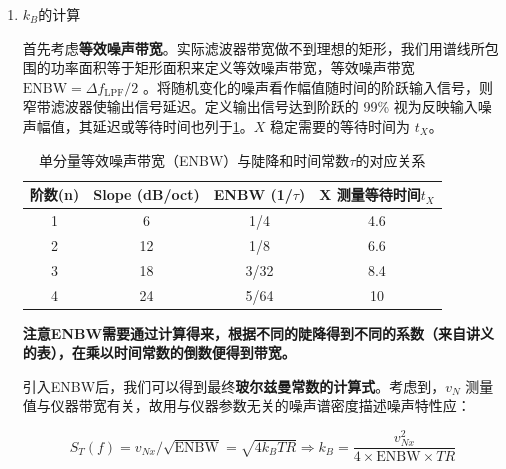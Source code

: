 \begin{enumerate}
	此外，锁相放大器自身产生的本底噪声也需要从测量结果中扣除，假设本底噪声的功率为 \( n_{\text{Bx}}^2 \)，最终修正后的噪声功率为：
	\[
	n_{\text{Tx}}^2 = n_{\text{Rx}}^2 \left[ 1 + (\omega R_{\text{in}} C_{\text{in}})^2 \right] - n_{\text{Bx}}^2
	\]
	
	为什么本底噪声不必做输入带宽修正？本底噪声是锁相放大器内部的固有噪声，不经过外部输入电路，因此不会受到输入带宽的影响，也无需进行带宽修正。而外部噪声，如电阻的热噪声，会受到输入阻抗和滤波器的影响，因此需要进行带宽修正。
	
	此外，注意讲义上提到的非随机的环境噪声$n_{ex}$。
	
	实验讲义上提供了具体的数值：影响输入带宽的 $R_{\text{in}}$ 约为 $2/3R$，$C_{\text{in}}$ 约为电缆电容（室温下约为 96pF/m）、锁相放大器输入电容（25pF），与包括连接器和样品盒在内的电容并联后的值的 1/2（约 \textbf{68pF}）。
	
	\item $k_B$的计算
	
	首先考虑\textbf{等效噪声带宽}。实际滤波器带宽做不到理想的矩形，我们用谱线所包围的功率面积等于矩形面积来定义等效噪声带宽，等效噪声带宽 $\text{ENBW} = \Delta f_{\text{LPF}}/2$ 。将随机变化的噪声看作幅值随时间的阶跃输入信号，则窄带滤波器使输出信号延迟。定义输出信号达到阶跃的 99\% 视为反映输入噪声幅值，其延迟或等待时间也列于\cref{tab:ENBW}。$X$ 稳定需要的等待时间为 $t_X$。
	
	\begin{table}[h!]
		\centering
		\caption{单分量等效噪声带宽（ENBW）与陡降和时间常数$\tau$的对应关系}
		\label{tab:ENBW}
		\begin{tabular}{cccc}
			\hline
			\textbf{阶数(n)} & \textbf{Slope (dB/oct)} & \textbf{ENBW (1/$\tau$)} & \textbf{X 测量等待时间$t_X$}\\
			\hline
			1 & 6 & 1/4 & 4.6 \\
			2 & 12 & 1/8 & 6.6 \\
			3 & 18 & 3/32 & 8.4 \\
			4 & 24 & 5/64 & 10 \\
			\hline
		\end{tabular}
	\end{table}
	
	\textbf{注意ENBW需要通过计算得来，根据不同的陡降得到不同的系数（来自讲义的表），在乘以时间常数的倒数便得到带宽。}
	
	引入ENBW后，我们可以得到最终\textbf{玻尔兹曼常数的计算式}。考虑到，$v_N$ 测量值与仪器带宽有关，故用与仪器参数无关的噪声谱密度描述噪声特性应：
	\begin{ubox}{}
		$$
		S_T(f)=v_{Nx}/\sqrt{\text{ENBW}} = \sqrt{4k_BTR} \Rightarrow k_B = \dfrac{v_{Nx}^2}{4\times\text{ENBW}\times TR}
		$$
	\end{ubox}
	

\end{enumerate}
